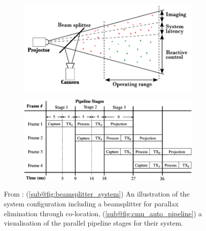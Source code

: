 \begin{figure}[H]
    \centering
    \begin{subfigure}{.49\textwidth}
        \centering
        \includegraphics[width=1\textwidth]{assets/beamsplitter_automotive_system.png}
        \caption{}
        \label{fig:beamsplitter_system}
    \end{subfigure}
    \hfill
    \begin{subfigure}{.49\textwidth}
        \centering
        \includegraphics[width=1\textwidth]{assets/cmu_auto_pipeline.png}
        \caption{}
        \label{fig:cmu_auto_pipeline}
    \end{subfigure}
    \caption{From \cite{decharetteFastReactiveControl2012}: (\ref{sub@fig:beamsplitter_system}) An illustration of the system configuration including a beamsplitter for parallax elimination through co-location, (\ref{sub@fig:cmu_auto_pipeline}) a visualisation of the parallel pipeline stages for their system.}
    \label{fig:decharette}
\end{figure}

